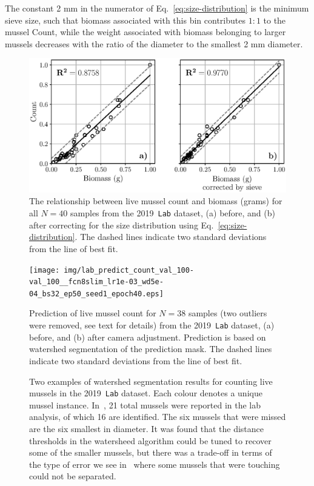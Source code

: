 \documentclass[11pt]{article} %
\begin{document}
The constant 2 mm in the numerator of Eq.~\eqref{eq:size-distribution} is the 
minimum sieve size, such that biomass associated with this bin contributes 
$1:1$ to the mussel Count, while the weight associated with biomass belonging 
to larger mussels decreases with the ratio of the diameter to the smallest 2 mm
diameter.

\begin{figure}
\centering
\includegraphics[width=0.9\linewidth]{img/lab_count_from_biomass.eps}
\caption{The relationship between live mussel count and biomass (grams)
for all $N=40$ samples from the 2019~\texttt{Lab} dataset, (a) before, and (b) 
after correcting for the size distribution using
Eq.~\eqref{eq:size-distribution}. The dashed lines indicate two standard
deviations from the line of best fit.}
\label{fig:count-from-biomass}
\end{figure}

\begin{figure}
\centering
\texttt{[image: img/lab\_predict\_count\_val\_100-val\_100\_\_fcn8slim\_lr1e-03\_wd5e-04\_bs32\_ep50\_seed1\_epoch40.eps]}
\caption{Prediction of live mussel count for $N=38$ samples (two outliers were
removed, see text for details) from the 2019~\texttt{Lab} dataset, (a) before, 
and (b) after camera adjustment. Prediction is based on watershed segmentation 
of the prediction mask. The dashed lines indicate two standard deviations from
the line of best fit.}
\label{fig:count-from-watershed}
\end{figure}

\begin{figure}
\centering
{}
\caption{Two examples of watershed segmentation results for counting live
mussels in the 2019~\texttt{Lab} dataset. Each colour denotes a unique mussel
instance. 
In~, 21 total mussels were reported in 
the lab analysis, of which 16 are identified. The six mussels that were 
missed are the six smallest in diameter. It was found that the distance 
thresholds in the watersheed algorithm could be tuned to recover some of the 
smaller mussels, but there was a trade-off in terms of the type of error we see 
in~ where some mussels that were touching could 
not be separated.}
\label{fig:watershed-samples}
\end{figure}
\end{document}
